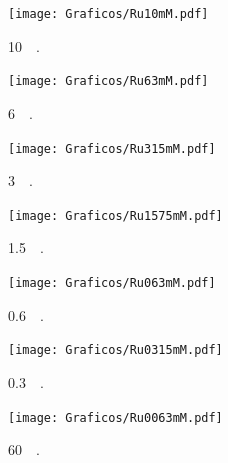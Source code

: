				\begin{figure}[th]
			   	    \begin{subfigure}[t]{0.325\textwidth}
			        	\texttt{[image: Graficos/Ru10mM.pdf]}
			        	\vspace*{-0.40cm}\caption{\aminorutenio\space \SI{10}{\milli\Molar}.}
			         	\label{fig:Ru10mM}
			     		\end{subfigure}
			   	    \begin{subfigure}[t]{0.325\textwidth}
			        	\texttt{[image: Graficos/Ru63mM.pdf]}
			       		\vspace*{-0.40cm}\caption{\aminorutenio\space \SI{6}{\milli\Molar}.}
			         	\label{fig:Ru63mM}
			     		\end{subfigure}
		     		\begin{subfigure}[t]{0.325\textwidth}
			        	\texttt{[image: Graficos/Ru315mM.pdf]}
			       		\vspace*{-0.40cm}\caption{\aminorutenio\space \SI{3}{\milli\Molar}.}
			         	\label{fig:Ru315mM}
			     		\end{subfigure}
		     		\begin{subfigure}[t]{0.325\textwidth}
			        	\texttt{[image: Graficos/Ru1575mM.pdf]}
			       		\vspace*{-0.40cm}\caption{\aminorutenio\space \SI{1.5}{\milli\Molar}.}
			         	\label{fig:Ru1575M}
			     		\end{subfigure}
		 	   	   	\begin{subfigure}[t]{0.325\textwidth}
			        	\texttt{[image: Graficos/Ru063mM.pdf]}
			       		\vspace*{-0.40cm}\caption{\aminorutenio\space \SI{0.6}{\milli\Molar}.}
			         	\label{fig:Ru063mM}
			     		\end{subfigure}
		     		\begin{subfigure}[t]{0.325\textwidth}
			        	\texttt{[image: Graficos/Ru0315mM.pdf]}
			       		\vspace*{-0.40cm}\caption{\aminorutenio\space \SI{0.3}{\milli\Molar}.}
			         	\label{fig:Ru0315mM}
			     		\end{subfigure}
			     	 \begin{subfigure}[t]{0.325\textwidth}
			        	\texttt{[image: Graficos/Ru0063mM.pdf]}
			       		\vspace*{-0.40cm}\caption{\aminorutenio\space \SI{60}{\micro\Molar}.}
			         	\label{fig:Ru0063mM}
			     		\end{subfigure}
		     		\begin{subfigure}[t]{0.325\textwidth}

\end{subfigure}
\end{figure}
